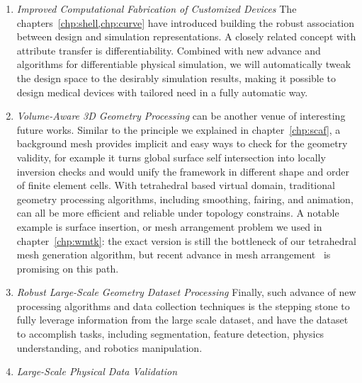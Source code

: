 \begin{enumerate}
\item \emph{Improved Computational Fabrication of Customized Devices}
The chapters~\ref{chp:shell,chp:curve} have introduced building the robust association between design and simulation representations. A closely related concept with attribute transfer is differentiability. Combined with new advance and algorithms for differentiable physical simulation, we will automatically tweak the design space to the desirably simulation results, making it possible to design medical devices with tailored need in a fully automatic way.

\item \emph{Volume-Aware 3D Geometry Processing}
can be another venue of interesting future works. Similar to the principle we explained in chapter~\ref{chp:scaf}, a background mesh provides implicit and easy ways to check for the geometry validity, for example it turns global surface self intersection into locally inversion checks and would unify the framework in different shape and order of finite element cells. With tetrahedral based virtual domain, traditional geometry processing algorithms, including smoothing, fairing, and animation, can all be more efficient and reliable under topology constrains. A notable example is surface insertion, or mesh arrangement problem we used in chapter~\ref{chp:wmtk}: the exact version is still the bottleneck of our tetrahedral mesh generation algorithm, but recent advance in mesh arrangement~\cite{Hu:2019:fTetWild,zhou2016mesh,ember2022} is promising on this path.

\item \emph{Robust Large-Scale Geometry Dataset Processing}
Finally, such advance of new processing algorithms and data collection techniques is the stepping stone to fully leverage information from the large scale dataset\cite{Koch_2019_CVPR,zhou2016thingi10k}, and have the dataset to accomplish tasks, including segmentation, feature detection, physics understanding, and robotics manipulation.

\item \emph{Large-Scale Physical Data Validation}
\end{enumerate}


